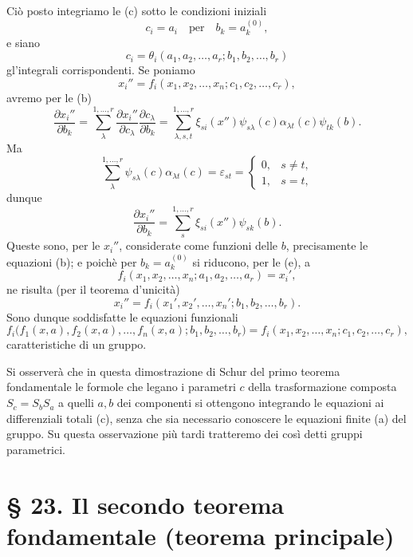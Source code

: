 \documentclass[11pt]{book}
\begin{document}
Ciò posto integriamo le (c) sotto le condizioni iniziali
\[
 c_i=a_i\quad\text{per}\quad b_k=a_k^{(0)},
\]
e siano
\begin{equation*}\tag{d}
 c_i=\theta_i(a_1,a_2,\ldots,a_r; b_1,b_2,\ldots,b_r)
\end{equation*}
gl'integrali corrispondenti. Se poniamo
\begin{equation*}\tag{e}
 x_i''=f_i(x_1,x_2,\ldots,x_n;c_1,c_2,\ldots,c_r),
\end{equation*}
avremo per le (b)
\[
 \frac{\partial x_i''}{\partial b_k}
 =\sum\limits_\lambda^{1,\ldots,r} \frac{\partial x_i''}{\partial c_\lambda}\frac{\partial c_\lambda}{\partial b_k}
 =\sum\limits_{\lambda,s,t}^{1,\ldots,r}\xi_{si}(x'')\psi_{s\lambda}(c)\alpha_{\lambda t}(c)\psi_{tk}(b).
\]
Ma
\[
 \sum\limits_\lambda^{1,\ldots,r}\psi_{s\lambda}(c)\alpha_{\lambda t}(c)=\varepsilon_{st}=\begin{cases}0,&s\ne t,\\1,&s=t,\end{cases}
\]
dunque
\[
 \frac{\partial x_i''}{\partial b_k}=\sum\limits_s^{1,\ldots,r}\xi_{si}(x'')\psi_{sk}(b).
\]
Queste sono, per le $x_i''$, considerate come funzioni delle $b$, precisamente le equazioni (b); e poichè per $b_k=a_k^{(0)}$ si riducono, per le (e), a
\[
 f_i(x_1,x_2,\ldots,x_n; a_1,a_2,\ldots,a_r)=x_i',
\]
ne risulta (per il teorema d'unicità)
\[
 x_i''=f_i(x_1',x_2',\ldots,x_n'; b_1,b_2,\ldots,b_r).
\]
Sono dunque soddisfatte le equazioni funzionali
\[
 f_i\bigl(f_1(x,a),f_2(x,a),\ldots,f_n(x,a); b_1,b_2,\ldots,b_r\bigr)
 =f_i(x_1,x_2,\ldots,x_n; c_1,c_2,\ldots,c_r),
\]
caratteristiche di un gruppo.

Si osserverà che in questa dimostrazione di Schur del primo teorema fondamentale le formole che legano i parametri $c$ della trasformazione composta $S_c=S_bS_a$ a quelli $a,b$ dei componenti si ottengono integrando le equazioni ai differenziali totali (c), senza che sia necessario conoscere le equazioni finite (a) del gruppo. Su questa osservazione più tardi tratteremo dei così detti gruppi parametrici.

\section*{\S{} 23. Il secondo teorema fondamentale (teorema principale)}
\end{document}

